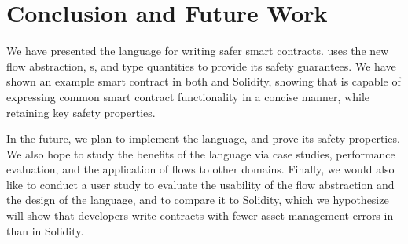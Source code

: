 \documentclass[dvipsnames,runningheads]{llncs}
\begin{document}
\section{Conclusion and Future Work}

We have presented the \langName language for writing safer smart contracts.
\langName uses the new flow abstraction, \assetTxt{}s, and type quantities to provide its safety guarantees.
We have shown an example smart contract in both \langName and Solidity, showing that \langName is capable of expressing common smart contract functionality in a concise manner, while retaining key safety properties.

In the future, we plan to implement the \langName language, and prove its safety properties.
We also hope to study the benefits of the language via case studies, performance evaluation, and the application of flows to other domains.
Finally, we would also like to conduct a user study to evaluate the usability of the flow abstraction and the design of the language, and to compare it to Solidity, which we hypothesize will show that developers write contracts with fewer asset management errors in \langName than in Solidity.



\end{document}
